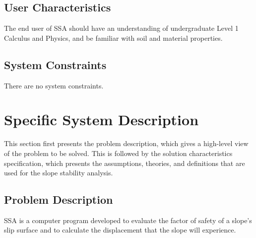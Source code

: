 \documentclass[12pt]{article}
\begin{document}
\subsection{User Characteristics}
\label{Sec:UserChars}
The end user of SSA should have an understanding of undergraduate Level 1 Calculus and Physics, and be familiar with soil and material properties.
\subsection{System Constraints}
\label{Sec:SysConstraints}
There are no system constraints.
\section{Specific System Description}
\label{Sec:SpecSystDesc}
This section first presents the problem description, which gives a high-level view of the problem to be solved. This is followed by the solution characteristics specification, which presents the assumptions, theories, and definitions that are used for the slope stability analysis.
\subsection{Problem Description}
\label{Sec:ProbDesc}
SSA is a computer program developed to evaluate the factor of safety of a slope's slip surface and to calculate the displacement that the slope will experience.
\end{document}
